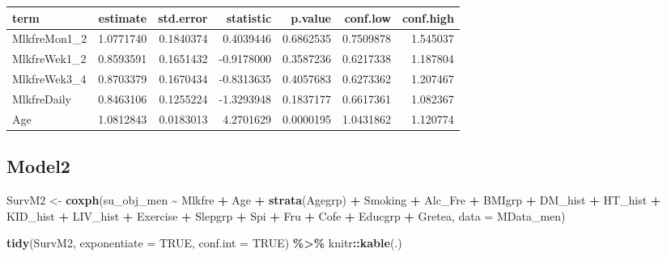 \documentclass[
]{article}
\newenvironment{Shaded}{\begin{snugshade}}{\end{snugshade}}
\newcommand{\DataTypeTok}[1]{\textcolor[rgb]{0.13,0.29,0.53}{#1}}
\newcommand{\KeywordTok}[1]{\textcolor[rgb]{0.13,0.29,0.53}{\textbf{#1}}}
\newcommand{\NormalTok}[1]{#1}
\newcommand{\OperatorTok}[1]{\textcolor[rgb]{0.81,0.36,0.00}{\textbf{#1}}}
\newcommand{\OtherTok}[1]{\textcolor[rgb]{0.56,0.35,0.01}{#1}}
\newcommand{\StringTok}[1]{\textcolor[rgb]{0.31,0.60,0.02}{#1}}
\begin{document}
\begin{longtable}[]{@{}lrrrrrr@{}}
\toprule
term & estimate & std.error & statistic & p.value & conf.low &
conf.high\tabularnewline
\midrule
\endhead
MlkfreMon1\_2 & 1.0771740 & 0.1840374 & 0.4039446 & 0.6862535 &
0.7509878 & 1.545037\tabularnewline
MlkfreWek1\_2 & 0.8593591 & 0.1651432 & -0.9178000 & 0.3587236 &
0.6217338 & 1.187804\tabularnewline
MlkfreWek3\_4 & 0.8703379 & 0.1670434 & -0.8313635 & 0.4057683 &
0.6273362 & 1.207467\tabularnewline
MlkfreDaily & 0.8463106 & 0.1255224 & -1.3293948 & 0.1837177 & 0.6617361
& 1.082367\tabularnewline
Age & 1.0812843 & 0.0183013 & 4.2701629 & 0.0000195 & 1.0431862 &
1.120774\tabularnewline
\bottomrule
\end{longtable}

\hypertarget{model2-3}{%
\subsection{Model2}\label{model2-3}}

\begin{Shaded}
\begin{Highlighting}[]
\NormalTok{SurvM2 \textless{}{-}}\StringTok{  }\KeywordTok{coxph}\NormalTok{(su\_obj\_men }\OperatorTok{\textasciitilde{}}\StringTok{ }\NormalTok{Mlkfre }\OperatorTok{+}\StringTok{ }\NormalTok{Age }\OperatorTok{+}\StringTok{ }\KeywordTok{strata}\NormalTok{(Agegrp) }\OperatorTok{+}\StringTok{ }\NormalTok{Smoking }\OperatorTok{+}\StringTok{ }\NormalTok{Alc\_Fre }\OperatorTok{+}\StringTok{ }
\StringTok{                   }\NormalTok{BMIgrp }\OperatorTok{+}\StringTok{ }\NormalTok{DM\_hist }\OperatorTok{+}\StringTok{ }\NormalTok{HT\_hist }\OperatorTok{+}\StringTok{ }\NormalTok{KID\_hist }\OperatorTok{+}\StringTok{ }\NormalTok{LIV\_hist }\OperatorTok{+}\StringTok{ }\NormalTok{Exercise }\OperatorTok{+}\StringTok{ }
\StringTok{                   }\NormalTok{Slepgrp }\OperatorTok{+}\StringTok{ }\NormalTok{Spi }\OperatorTok{+}\StringTok{ }\NormalTok{Fru }\OperatorTok{+}\StringTok{ }\NormalTok{Cofe }\OperatorTok{+}\StringTok{ }\NormalTok{Educgrp }\OperatorTok{+}\StringTok{ }\NormalTok{Gretea, }
                 \DataTypeTok{data =}\NormalTok{ MData\_men)}

\KeywordTok{tidy}\NormalTok{(SurvM2, }\DataTypeTok{exponentiate =} \OtherTok{TRUE}\NormalTok{, }\DataTypeTok{conf.int =} \OtherTok{TRUE}\NormalTok{) }\OperatorTok{\%\textgreater{}\%}\StringTok{ }
\StringTok{  }\NormalTok{knitr}\OperatorTok{::}\KeywordTok{kable}\NormalTok{(.)}
\end{Highlighting}
\end{Shaded}
\end{document}
